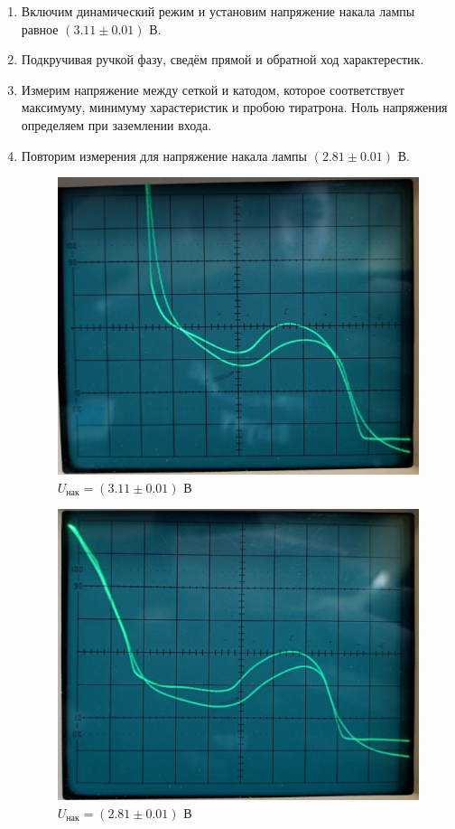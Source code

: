 \begin{enumerate}
    
    \item Включим динамический режим и установим напряжение накала лампы равное $(3.11 \pm 0.01) \text{ В}$.
    \item Подкручивая ручкой фазу, сведём прямой и обратной ход характерестик. 
    \item Измерим напряжение между сеткой и катодом, которое соответствует максимуму, минимуму харастеристик и пробою тиратрона. Ноль напряжения определяем при заземлении входа.
    \item Повторим измерения для напряжение накала лампы $(2.81 \pm 0.01) \text{ В}$.

	\begin{figure}[H]
		\centering
		\includegraphics[width = 11 cm]{images/osc_311}
		\caption{$U_{\text{нак}} = (3.11 \pm 0.01) \text{ В}$}
		\label{VAH_311}
	\end{figure}

	\begin{figure}[H]
		\centering
		\includegraphics[width = 11 cm]{images/osc_281}
		\caption{$U_{\text{нак}} = (2.81 \pm 0.01) \text{ В}$}
		\label{VAH_281}
	\end{figure}


\end{enumerate}

